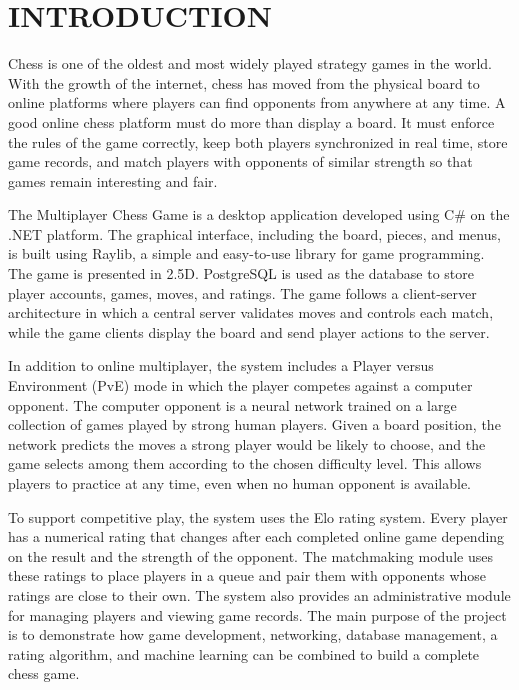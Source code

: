 \tableofcontents
\newpage
\listoffigures
\newpage
\listoftables

\setcounter{page}{1}


\chapter{INTRODUCTION}
\label{ch:introduction}

Chess is one of the oldest and most widely played strategy games in the world. With the growth of the internet, chess has moved from the physical board to online platforms where players can find opponents from anywhere at any time. A good online chess platform must do more than display a board. It must enforce the rules of the game correctly, keep both players synchronized in real time, store game records, and match players with opponents of similar strength so that games remain interesting and fair.

The Multiplayer Chess Game is a desktop application developed using C\# on the .NET platform. The graphical interface, including the board, pieces, and menus, is built using Raylib, a simple and easy-to-use library for game programming. The game is presented in 2.5D. PostgreSQL is used as the database to store player accounts, games, moves, and ratings. The game follows a client-server architecture in which a central server validates moves and controls each match, while the game clients display the board and send player actions to the server.

In addition to online multiplayer, the system includes a Player versus Environment (PvE) mode in which the player competes against a computer opponent. The computer opponent is a neural network trained on a large collection of games played by strong human players. Given a board position, the network predicts the moves a strong player would be likely to choose, and the game selects among them according to the chosen difficulty level. This allows players to practice at any time, even when no human opponent is available.

To support competitive play, the system uses the Elo rating system. Every player has a numerical rating that changes after each completed online game depending on the result and the strength of the opponent. The matchmaking module uses these ratings to place players in a queue and pair them with opponents whose ratings are close to their own. The system also provides an administrative module for managing players and viewing game records. The main purpose of the project is to demonstrate how game development, networking, database management, a rating algorithm, and machine learning can be combined to build a complete chess game.


